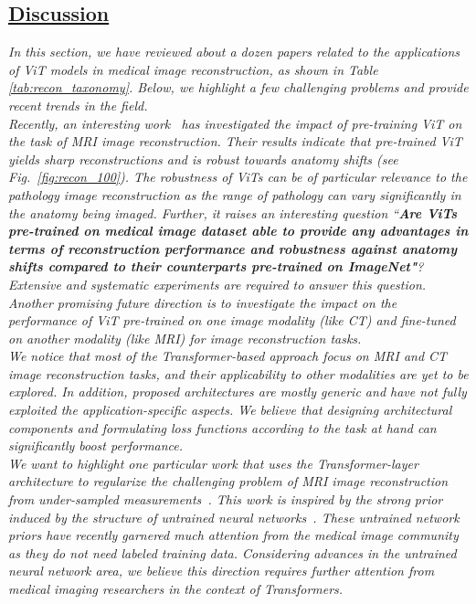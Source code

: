 \documentclass[10pt,journal,compsoc]{IEEEtran}
\begin{document}
\begin{tcolorbox}[top=0.5pt,left=0pt,size=minimal,boxrule = 0pt,breakable, enhanced]%
\subsection{\textbf{ \underline{Discussion}}}
\textit{ In this section, we have reviewed about a dozen papers related to the applications of ViT models in medical image reconstruction, as shown in Table \ref{tab:recon_taxonomy}. Below, we highlight a few challenging problems and provide recent trends in the field.}
 \\
\vspace{0.01em}
\textit{ Recently, an interesting work~\cite{lin2021vision} has investigated the impact of pre-training ViT on the task of MRI image reconstruction. Their results indicate that pre-trained ViT yields sharp reconstructions and is robust towards anatomy shifts (see Fig.~\ref{fig:recon_100}). The robustness of ViTs can be of particular relevance to the pathology image reconstruction as the range of pathology can vary significantly in the anatomy being imaged. Further, it raises an interesting question ``\textbf{Are ViTs pre-trained on medical image dataset able to provide any advantages in terms of reconstruction performance and robustness against anatomy shifts compared to their counterparts pre-trained on ImageNet"}? Extensive and systematic experiments are required to answer this question. Another promising future direction is to investigate the impact on the performance of ViT pre-trained on one image modality (like CT) and fine-tuned on another modality (like MRI) for image reconstruction tasks.  }
 \\
\vspace{0.01em}
\textit{ We notice that most of the Transformer-based approach focus on MRI and CT image reconstruction tasks, and their applicability to other modalities are yet to be explored.
In addition, proposed architectures are mostly generic and have not fully exploited the application-specific aspects. We believe that designing architectural components and formulating loss functions according to the task at hand can significantly boost performance. 
}
 \\
\vspace{0.01em}
\textit{ We want to highlight one particular work that uses the Transformer-layer architecture to regularize the challenging problem of MRI image reconstruction from under-sampled measurements~\cite{korkmaz2021unsupervised}. This work is inspired by the strong prior induced by the structure of untrained neural networks~\cite{ulyanov2018deep,qayyum2021untrained}. These untrained network priors have recently garnered much attention from the medical image community as they do not need labeled training data. Considering advances in the untrained neural network area, we believe this direction requires further attention from medical imaging researchers in the context of Transformers.}

\end{tcolorbox}
\end{document}
